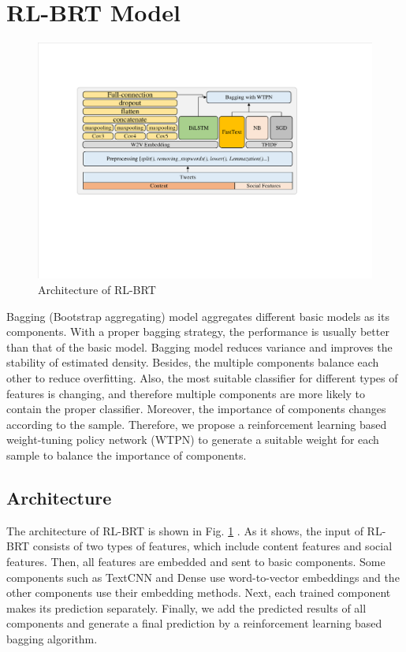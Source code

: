 \section{RL-BRT Model}
\label{sec:model}

\begin{figure}[htbp]
	\hspace{0ex}
	\vspace{0ex}
	\centering
	\includegraphics[width = \textwidth]{fig/structure}
	\caption{Architecture of RL-BRT}
	\label{fig:architecture}
\end{figure}

Bagging (Bootstrap aggregating) model \cite{DBLP:journals/ml/Breiman96b} aggregates different basic models as its components. With a proper bagging strategy, the performance is usually better than that of the basic model. Bagging model reduces variance and improves the
stability of estimated density. Besides, the multiple components balance each other to reduce overfitting. Also, the most suitable classifier for different types of features is changing, and therefore multiple components are more likely to contain the proper classifier. Moreover, the importance of components changes according to the sample. Therefore, we propose a reinforcement learning based weight-tuning policy network (WTPN) to generate a suitable weight for each sample to balance the importance of components. 

\subsection{Architecture}
\label{sec:architecture}
The architecture of RL-BRT is shown in Fig. \ref{fig:architecture} . As it shows, the input of  RL-BRT consists of two types of features, which include content features and social features. Then, all features are embedded and sent to basic components.  Some components such as TextCNN and Dense use word-to-vector embeddings and the other components use their embedding methods. Next, each trained component makes its prediction separately. Finally, we add the predicted results of all components and generate a final prediction by a reinforcement learning based bagging algorithm.

